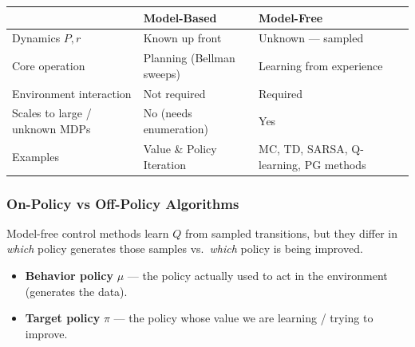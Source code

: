 \documentclass[11pt]{article}
\newcounter{none}
\providecommand{\tightlist}{%
      \setlength{\itemsep}{0pt}\setlength{\parskip}{0pt}}
\begin{document}
{\def\LTcaptype{none} %
\begin{longtable}[]{@{}
  >{\raggedright\arraybackslash}p{}
  >{\raggedright\arraybackslash}p{}
  >{\raggedright\arraybackslash}p{}@{}}
\toprule\noalign{}
\begin{minipage}[b]{\linewidth}\raggedright
\end{minipage} & \begin{minipage}[b]{\linewidth}\raggedright
Model-Based
\end{minipage} & \begin{minipage}[b]{\linewidth}\raggedright
Model-Free
\end{minipage} \\
\midrule\noalign{}
\endhead
\bottomrule\noalign{}
\endlastfoot
Dynamics \(P, r\) & Known up front & Unknown --- sampled \\
Core operation & Planning (Bellman sweeps) & Learning from experience \\
Environment interaction & Not required & Required \\
Scales to large / unknown MDPs & No (needs enumeration) & Yes \\
Examples & Value \& Policy Iteration & MC, TD, SARSA, Q-learning, PG
methods \\
\end{longtable}
}

    \clearpage

\label{on-off-policy-intro}

    \subsubsection{On-Policy vs Off-Policy
Algorithms}\label{on-policy-vs-off-policy-algorithms}

Model-free control methods learn \(Q\) from sampled transitions, but
they differ in \emph{which} policy generates those samples
vs.~\emph{which} policy is being improved.

\begin{itemize}
\tightlist
\item
  \textbf{Behavior policy} \(\mu\) --- the policy actually used to act
  in the environment (generates the data).
\item
  \textbf{Target policy} \(\pi\) --- the policy whose value we are
  learning / trying to improve.
\end{itemize}
\end{document}
